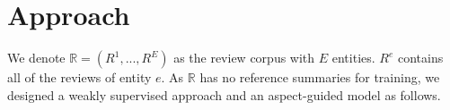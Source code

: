 \section{Approach}
\label{sec:approach}
We denote $\mathbb{R}=(R^1, ..., R^E)$ as the review corpus with $E$ entities. %
$R^e$ contains all of the reviews of entity $e$. %
As $\mathbb{R}$ has no reference summaries for training,
we designed a weakly supervised approach and an
aspect-guided model as follows.


